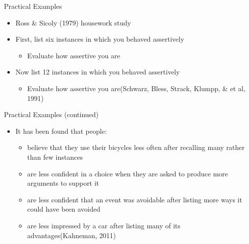 \documentclass[
  ignorenonframetext,
]{beamer}
\providecommand{\tightlist}{%
  \setlength{\itemsep}{0pt}\setlength{\parskip}{0pt}}\usepackage{longtable,booktabs,array}
\begin{document}
\begin{frame}{Practical Examples}
\protect\hypertarget{practical-examples}{}
\begin{itemize}
\tightlist
\item
  Ross \& Sicoly (1979) housework study
\end{itemize}

\begin{itemize}
\tightlist
\item
  First, list six instances in which you behaved assertively

  \begin{itemize}
  \tightlist
  \item
    Evaluate how assertive you are
  \end{itemize}
\item
  Now list 12 instances in which you behaved assertively

  \begin{itemize}
  \tightlist
  \item
    Evaluate how assertive you are(Schwarz, Bless, Strack, Klumpp, \& et
    al, 1991)
  \end{itemize}
\end{itemize}
\end{frame}

\begin{frame}{Practical Examples (continued)}
\protect\hypertarget{practical-examples-continued}{}
\begin{itemize}
\tightlist
\item
  It has been found that people:

  \begin{itemize}
  \tightlist
  \item
    believe that they use their bicycles less often after recalling many
    rather than few instances
  \item
    are less confident in a choice when they are asked to produce more
    arguments to support it
  \item
    are less confident that an event was avoidable after listing more
    ways it could have been avoided
  \item
    are less impressed by a car after listing many of its
    advantages(Kahneman, 2011)
  \end{itemize}
\end{itemize}
\end{frame}
\end{document}
